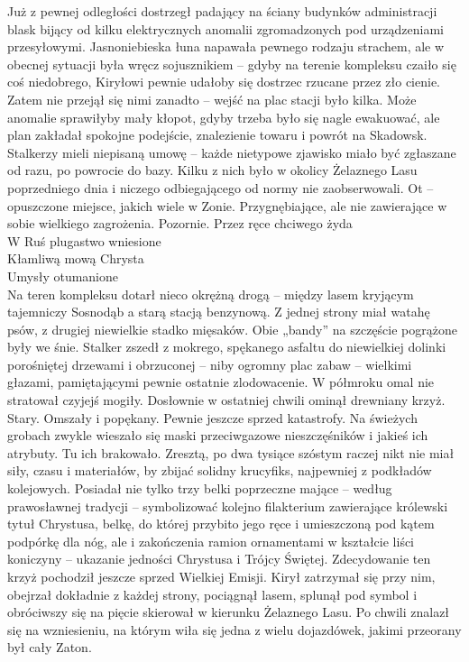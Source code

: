 \documentclass[../MAIN.tex]{subfiles}
\begin{document}
Już z pewnej odległości dostrzegł padający na ściany budynków administracji blask bijący od kilku elektrycznych anomalii zgromadzonych pod urządzeniami przesyłowymi. Jasnoniebieska łuna napawała pewnego rodzaju strachem, ale w obecnej sytuacji była wręcz sojusznikiem – gdyby na terenie kompleksu czaiło się coś niedobrego, Kiryłowi pewnie udałoby się dostrzec rzucane przez zło cienie. Zatem nie przejął się nimi zanadto – wejść na plac stacji było kilka. Może anomalie sprawiłyby mały kłopot, gdyby trzeba było się nagle ewakuować, ale plan zakładał spokojne podejście, znalezienie towaru i powrót na Skadowsk. Stalkerzy mieli niepisaną umowę – każde nietypowe zjawisko miało być zgłaszane od razu, po powrocie do bazy. Kilku z nich było w okolicy Żelaznego Lasu poprzedniego dnia i niczego odbiegającego od normy nie zaobserwowali. Ot – opuszczone miejsce, jakich wiele w Zonie. Przygnębiające, ale nie zawierające w sobie wielkiego zagrożenia. Pozornie.
\sw
Przez ręce chciwego żyda\\
W Ruś plugastwo wniesione\\
Kłamliwą mową Chrysta\\
Umysły otumanione\\
\qw
Na teren kompleksu dotarł nieco okrężną drogą – między lasem kryjącym tajemniczy Sosnodąb a starą stacją benzynową. Z jednej strony miał watahę psów, z drugiej niewielkie stadko mięsaków. Obie „bandy” na szczęście pogrążone były we śnie. Stalker zszedł z mokrego, spękanego asfaltu do niewielkiej dolinki porośniętej drzewami i obrzuconej – niby ogromny plac zabaw – wielkimi głazami, pamiętającymi pewnie ostatnie zlodowacenie. W półmroku omal nie stratował czyjejś mogiły. Dosłownie w ostatniej chwili ominął drewniany krzyż. Stary. Omszały i popękany. Pewnie jeszcze sprzed katastrofy. Na świeżych grobach zwykle wieszało się maski przeciwgazowe nieszczęśników i jakieś ich atrybuty. Tu ich brakowało. Zresztą, po dwa tysiące szóstym raczej nikt nie miał siły, czasu i materiałów, by zbijać solidny krucyfiks, najpewniej z podkładów kolejowych. Posiadał nie tylko trzy belki poprzeczne mające – według prawosławnej tradycji – symbolizować kolejno filakterium zawierające królewski tytuł Chrystusa, belkę, do której 
przybito jego ręce i umieszczoną pod kątem podpórkę dla nóg, ale i zakończenia ramion ornamentami w kształcie liści koniczyny – ukazanie jedności Chrystusa i Trójcy Świętej. Zdecydowanie ten krzyż pochodził jeszcze sprzed Wielkiej Emisji. Kirył zatrzymał się przy nim, obejrzał dokładnie z każdej strony, pociągnął lasem, splunął pod symbol i obróciwszy się na pięcie skierował w kierunku Żelaznego Lasu. Po chwili znalazł się na wzniesieniu, na którym wiła się jedna z wielu dojazdówek, jakimi przeorany był cały Zaton.
\end{document}
